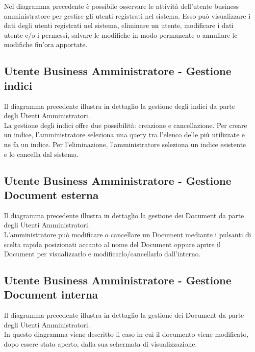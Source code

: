 Nel diagramma precedente è possibile osservare le attività dell'utente business amministratore per gestire gli utenti registrati nel sistema. Esso può visualizzare i dati degli utenti registrati nel sistema, eliminare un utente, modificare i dati utente e/o i permessi, salvare le modifiche in modo permanente o annullare le modifiche fin'ora apportate.

\subsection{Utente Business Amministratore - Gestione indici}
Il diagramma precedente illustra in dettaglio la gestione degli indici da parte degli Utenti Amministratori.\\
La gestione degli indici offre due possibilità: creazione e cancellazione.
Per creare un indice, l'amministratore seleziona una query tra l'elenco delle più utilizzate e ne fa un indice.
Per l'eliminazione, l'amministratore seleziona un indice esistente e lo cancella dal sistema.

\subsection{Utente Business Amministratore - Gestione Document esterna}
Il diagramma precedente illustra in dettaglio la gestione dei Document da parte degli Utenti Amministratori.\\
L'amministratore può modificare o cancellare un Document mediante i pulsanti di scelta rapida posizionati accanto al nome del Document oppure aprire il Document per visualizzarlo e modificarlo/cancellarlo dall'interno.

\subsection{Utente Business Amministratore - Gestione Document interna}
Il diagramma precedente illustra in dettaglio la gestione dei Document da parte degli Utenti Amministratori.\\
In questo diagramma viene descritto il caso in cui il documento viene modificato, dopo essere stato aperto, dalla sua schermata di visualizzazione.

